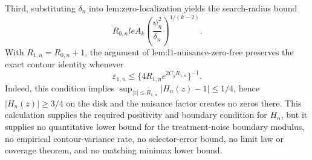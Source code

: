 Third, substituting \(\delta_n\) into \(\text{lem:zero-localization}\) yields the search-radius bound
\[
 R_{0,n}le A_k
 \left(\frac{\psi_{\eta}^2}{\delta_n}\right)^{1/(k-2)}.
\]
With \(R_{1,n}=R_{0,n}+1\), the argument of \(\text{lem:l1-nuisance-zero-free}\) preserves the exact contour identity whenever
\[
 \varepsilon_{1,n}
 \le\{4R_{1,n}e^{2C_gR_{1,n}}\}^{-1}.
\]
Indeed, this condition implies \(\sup_{|z|\le R_{1,n}}|H_n(z)-1|\le1/4\), hence \(|H_n(z)|\ge3/4\) on the disk and the nuisance factor creates no zeros there.  This calculation supplies the required positivity and boundary condition for \(H_n\), but it supplies no quantitative lower bound for the treatment-noise boundary modulus, no empirical contour-variance rate, no selector-error bound, no limit law or coverage theorem, and no matching minimax lower bound.